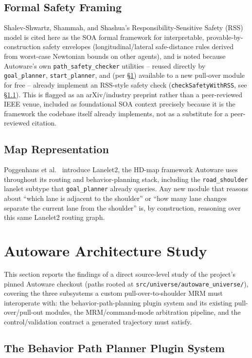 \documentclass[11pt]{article}
\newcommand{\code}[1]{\texttt{#1}}
\newcommand{\pkg}[1]{\texttt{#1}}
\begin{document}
\subsection{Formal Safety Framing}
Shalev-Shwartz, Shammah, and Shashua's Responsibility-Sensitive Safety (RSS) model
\cite{shalevshwartz2017rss} is cited here as the SOA formal framework for interpretable,
provable-by-construction safety envelopes (longitudinal/lateral safe-distance rules derived from
worst-case Newtonian bounds on other agents), and is noted because Autoware's own
\pkg{path\_safety\_checker} utilities -- reused directly by \pkg{goal\_planner},
\pkg{start\_planner}, and (per \S\ref{sec:autoware}) available to a new pull-over module for free
-- already implement an RSS-style safety check (\code{checkSafetyWithRSS}, see
\S\ref{sec:goalplanner}). This is flagged as an arXiv/industry preprint rather than a peer-reviewed
IEEE venue, included as foundational SOA context precisely because it is the framework the
codebase itself already implements, not as a substitute for a peer-reviewed citation.

\subsection{Map Representation}
Poggenhans et al.\ \cite{poggenhans2018lanelet2} introduce Lanelet2, the HD-map framework Autoware
uses throughout its routing and behavior-planning stack, including the \code{road\_shoulder}
lanelet subtype that \pkg{goal\_planner} already queries. Any new module that reasons about
``which lane is adjacent to the shoulder'' or ``how many lane changes separate the current lane
from the shoulder'' is, by construction, reasoning over this same Lanelet2 routing graph.

\section{Autoware Architecture Study}
\label{sec:autoware}

This section reports the findings of a direct source-level study of the project's pinned Autoware
checkout (paths rooted at \code{src/universe/autoware\_universe/}), covering the three subsystems a
custom pull-over-to-shoulder MRM must interoperate with: the behavior-path-planning plugin system
and its existing pull-over/pull-out modules, the MRM/command-mode arbitration pipeline, and the
control/validation contract a generated trajectory must satisfy.

\subsection{The Behavior Path Planner Plugin System}
\label{sec:goalplanner}
\end{document}
